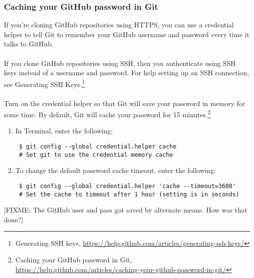 \documentclass[12pt,letterpaper,dvips]{article}
\newcommand{\FIXME}[1]{\textsf{[FIXME: #1]}}
\begin{document}

\subsubsection{Caching your GitHub password in Git}
If you're cloning GitHub repositories using HTTPS, you can use a
credential helper to tell Git to remember your GitHub username
and password every time it talks to GitHub.
\\
\\
If you clone GitHub repositories using SSH, then you authenticate
using SSH keys instead of a username and password.  For help
setting up an SSH connection, see Generating SSH Keys.\footnote{Generating SSH keys,
\href{https://help.github.com/articles/generating-ssh-keys/}{https://help.github.com/articles/generating-ssh-keys/}}
\\
\\
Turn on the credential helper so that Git will save your password
in memory for some time.  By default, Git will cache your password
for 15 minutes.\footnote{Caching your GitHub password in Git,
\href{https://help.github.com/articles/caching-your-github-password-in-git/}{https://help.github.com/articles/caching-your-github-password-in-git/}}

\begin{enumerate}
  \item{In Terminal, enter the following:
\begin{Verbatim}
 $ git config --global credential.helper cache
 # Set git to use the credential memory cache
\end{Verbatim}
       }
  \item{To change the default password cache timeout, enter the following:
\begin{Verbatim}
 $ git config --global credential.helper 'cache --timeout=3600'
 # Set the cache to timeout after 1 hour (setting is in seconds)
\end{Verbatim}
       }
\end{enumerate}

\noindent \FIXME{The GitHub user and pass got saved by alternate means.  How was that done?}
\end{document}
